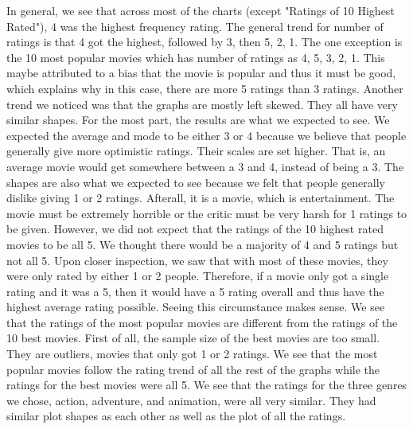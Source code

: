 In general, we see that across most of the charts (except "Ratings of 10 Highest Rated"), 4 was the highest frequency rating. The general trend for number of ratings is that 4 got the highest, followed by 3, then 5, 2, 1. The one exception is the 10 most popular movies which has number of ratings as 4, 5, 3, 2, 1. This maybe attributed to a bias that the movie is popular and thus it must be good, which explains why in this case, there are more 5 ratings than 3 ratings. Another trend we noticed was that the graphs are mostly left skewed. They all have very similar shapes. For the most part, the results are what we expected to see. We expected the average and mode to be either 3 or 4 because we believe that people generally give more optimistic ratings. Their scales are set higher. That is, an average movie would get somewhere between a 3 and 4, instead of being a 3. The shapes are also what we expected to see because we felt that people generally dislike giving 1 or 2 ratings. Afterall, it is a movie, which is entertainment. The movie must be extremely horrible or the critic must be very harsh for 1 ratings to be given. However, we did not expect that the ratings of the 10 highest rated movies to be all 5. We thought there would be a majority of 4 and 5 ratings but not all 5. Upon closer inspection, we saw that with most of these movies, they were only rated by either 1 or 2 people. Therefore, if a movie only got a single rating and it was a 5, then it would have a 5 rating overall and thus have the highest average rating possible. Seeing this circumstance makes sense. We see that the ratings of the most popular movies are different from the ratings of the 10 best movies. First of all, the sample size of the best movies are too small. They are outliers, movies that only got 1 or 2 ratings. We see that the most popular movies follow the rating trend of all the rest of the graphs while  the ratings for the best movies were all 5. We see that the ratings for the three genres we chose, action, adventure, and animation, were all very similar. They had similar plot shapes as each other as well as the plot of all the ratings. 
\newpage

